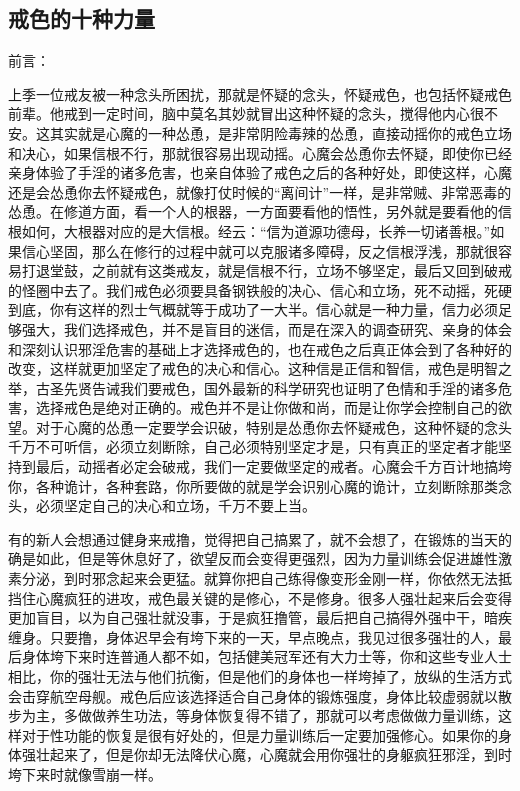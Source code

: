 \subsection{戒色的十种力量}

前言：

上季一位戒友被一种念头所困扰，那就是怀疑的念头，怀疑戒色，也包括怀疑戒色前辈。他戒到一定时间，脑中莫名其妙就冒出这种怀疑的念头，搅得他内心很不安。这其实就是心魔的一种怂恿，是非常阴险毒辣的怂恿，直接动摇你的戒色立场和决心，如果信根不行，那就很容易出现动摇。心魔会怂恿你去怀疑，即使你已经亲身体验了手淫的诸多危害，也亲自体验了戒色之后的各种好处，即使这样，心魔还是会怂恿你去怀疑戒色，就像打仗时候的“离间计”一样，是非常贼、非常恶毒的怂恿。在修道方面，看一个人的根器，一方面要看他的悟性，另外就是要看他的信根如何，大根器对应的是大信根。经云：“信为道源功德母，长养一切诸善根。”如果信心坚固，那么在修行的过程中就可以克服诸多障碍，反之信根浮浅，那就很容易打退堂鼓，之前就有这类戒友，就是信根不行，立场不够坚定，最后又回到破戒的怪圈中去了。我们戒色必须要具备钢铁般的决心、信心和立场，死不动摇，死硬到底，你有这样的烈士气概就等于成功了一大半。信心就是一种力量，信力必须足够强大，我们选择戒色，并不是盲目的迷信，而是在深入的调查研究、亲身的体会和深刻认识邪淫危害的基础上才选择戒色的，也在戒色之后真正体会到了各种好的改变，这样就更加坚定了戒色的决心和信心。这种信是正信和智信，戒色是明智之举，古圣先贤告诫我们要戒色，国外最新的科学研究也证明了色情和手淫的诸多危害，选择戒色是绝对正确的。戒色并不是让你做和尚，而是让你学会控制自己的欲望。对于心魔的怂恿一定要学会识破，特别是怂恿你去怀疑戒色，这种怀疑的念头千万不可听信，必须立刻断除，自己必须特别坚定才是，只有真正的坚定者才能坚持到最后，动摇者必定会破戒，我们一定要做坚定的戒者。心魔会千方百计地搞垮你，各种诡计，各种套路，你所要做的就是学会识别心魔的诡计，立刻断除那类念头，必须坚定自己的决心和立场，千万不要上当。

有的新人会想通过健身来戒撸，觉得把自己搞累了，就不会想了，在锻炼的当天的确是如此，但是等休息好了，欲望反而会变得更强烈，因为力量训练会促进雄性激素分泌，到时邪念起来会更猛。就算你把自己练得像变形金刚一样，你依然无法抵挡住心魔疯狂的进攻，戒色最关键的是修心，不是修身。很多人强壮起来后会变得更加盲目，以为自己强壮就没事，于是疯狂撸管，最后把自己搞得外强中干，暗疾缠身。只要撸，身体迟早会有垮下来的一天，早点晚点，我见过很多强壮的人，最后身体垮下来时连普通人都不如，包括健美冠军还有大力士等，你和这些专业人士相比，你的强壮无法与他们抗衡，但是他们的身体也一样垮掉了，放纵的生活方式会击穿航空母舰。戒色后应该选择适合自己身体的锻炼强度，身体比较虚弱就以散步为主，多做做养生功法，等身体恢复得不错了，那就可以考虑做做力量训练，这样对于性功能的恢复是很有好处的，但是力量训练后一定要加强修心。如果你的身体强壮起来了，但是你却无法降伏心魔，心魔就会用你强壮的身躯疯狂邪淫，到时垮下来时就像雪崩一样。

